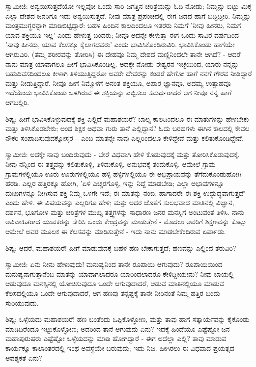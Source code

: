 ಸ್ವಾಮೀಜಿ: ಅನ್ವಯಿಸುತ್ತದೆಯೋ ಇಲ್ಲವೋ ಒಂದು ಸಾರಿ ಜಗತ್ತಿನ ಚರಿತ್ರೆಯನ್ನು ಓದಿ ನೋಡು; ನಿಮ್ಮನ್ನು ಬಿಟ್ಟು ಮಿಕ್ಕ ಎಲ್ಲಾ ದೇಶದ ಜನರಿಗೂ ಇದು ಅನ್ವಯಿಸುತ್ತದೆ. ನೀವು ಮಾತ್ರ ಪ್ರಪಂಚದಲ್ಲಿ ಈಗ ಜಡದ ಹಾಗೆ ಬಿದ್ದಿದ್ದೀರಿ. ನಿಮ್ಮನ್ನು ಮಂತ್ರಮುಗ್ಧರನ್ನಾಗಿ ಮಾಡಿಬಿಟ್ಟಿದ್ದಾರೆ: ಬಹಳ ಹಿಂದಿನ ಕಾಲದಿಂದಲೂ ಇತರರು ನಿಮಗೆ 'ನೀವು ಹೀನರು, ನಿಮಗೆ ಯಾವ ಶಕ್ತಿಯೂ ಇಲ್ಲ' ಎಂದು ಹೇಳುತ್ತ ಬಂದರು; ನೀವೂ ಅದನ್ನೇ ಕೇಳುತ್ತಾ ಈಗ ಒಂದು ಸಾವಿರ ವರ್ಷದಿಂದ 'ನಾವು ಹೀನರು, ಯಾವ ಕೆಲಸಕ್ಕೂ ಕೈಲಾಗದವರು' ಎಂದು ಭಾವಿಸಿಕೊಂಡಿರುವಿರಿ. ಭಾವಿಸಿಕೊಂಡು ಹಾಗೆಯೇ ಆಗಿರುವಿರಿ. (ತಮ್ಮ ಶರೀರವನ್ನು ತೋರಿಸಿ) ಈ ದೇಹವೂ ನಿಮ್ಮ ದೇಶದ ಮಣ್ಣಿನಿಂದಲೇ ತಾನೇ ಆಗಿದೆ? - ಆದರೆ ನಾನು ಮಾತ್ರ ಯಾವಾಗಲೂ ಹೀಗೆ ಭಾವಿಸಿಕೊಂಡಿಲ್ಲ. ಅದಕ್ಕೇ ನೋಡು ಈಶ್ವರನ ಇಚ್ಛೆಯಿಂದ, ಯಾರು ನನ್ನನ್ನು ಬಹುದಿವಸದಿಂದಲೂ ಕೀಳಾಗಿ ತಿಳಿಯುತ್ತಿದ್ದರೋ ಅವರೇ ದೇವರನ್ನು ಕಂಡರೆ ಹೇಗೋ ಹಾಗೆ ನನಗೆ ಗೌರವ ನೀಡಿದ್ದಾರೆ ಮತ್ತು ನೀಡುತ್ತಿದ್ದಾರೆ. ನೀವೂ ಹೀಗೆ ನಿಮ್ಮೊಳಗೆ ಅನಂತ ಶಕ್ತಿಯೂ, ಅಪಾರ ಜ್ಞಾನವೂ, ಅದಮ್ಯ ಉತ್ಸಾಹವೂ ಇದೆಯೆಂದು ಭಾವಿಸಿಕೊಂಡು ಒಳಗಿರುವ ಈ ಶಕ್ತಿಯನ್ನು ಎಬ್ಬಿಸಲು ಸಮರ್ಥರಾದರೆ ಆಗ ನೀವೂ ನನ್ನ ಹಾಗೆ ಆಗಬಲ್ಲಿರಿ.

ಶಿಷ್ಯ: ಹೀಗೆ ಭಾವಿಸಿಕೊಳ್ಳುವುದಕ್ಕೆ ಶಕ್ತಿ ಎಲ್ಲಿದೆ ಮಹಾಶಯರೆ? ಬಾಲ್ಯ ಕಾಲದಿಂದಲೂ ಈ ಮಾತುಗಳನ್ನು ಹೇಳಬೇಕು ಮತ್ತು ತಿಳಿಸಿಕೊಡಬೇಕು; ಅಂಥ ಶಿಕ್ಷಕ ಅಥವಾ ಗುರು ತಾನೆ ಎಲ್ಲಿದ್ದಾನೆ? ಓದು ಬರಹಗಳು ಈಗಿನ ಕಾಲದಲ್ಲಿ ಕೇವಲ ನೌಕರಿ ಸಂಪಾದಿಸುವುದಕ್ಕೋಸ್ಕರ – ಎಂಬ ಮಾತನ್ನೇ ನಾವು ಎಲ್ಲರಿಂದಲೂ ಕೇಳಿದ್ದೇವೆ ಮತ್ತು ಕಲಿತುಕೊಂಡಿದ್ದೇವೆ.

ಸ್ವಾಮೀಜಿ: ಅದಕ್ಕೇ ನಾವು ಬಂದಿರುವುದು - ಬೇರೆ ವಿಧವಾಗಿ ಹೇಳಿ ಕೊಡುವುದಕ್ಕೆ ಮತ್ತು ತೋರಿಸಿಕೊಡುವುದಕ್ಕೆ. ನೀವು ನನ್ನಿಂದ ಈ ತತ್ತ್ವವನ್ನು ಕಲಿತುಕೊಳ್ಳಿ, ತಿಳಿದುಕೊಳ್ಳಿ, ಅನುಭವಕ್ಕೆ ತಂದುಕೊಳ್ಳಿ. ಆಮೇಲೆ ಗ್ರಾಮ ಗ್ರಾಮಗಳಲ್ಲಿಯೂ ಊರು ಊರುಗಳಲ್ಲಿಯೂ ಹಳ್ಳಿ ಹಳ್ಳಿಗಳಲ್ಲಿಯೂ ಈ ಅಭಿಪ್ರಾಯವನ್ನು ತೆಗೆದುಕೊಂಡುಹೋಗಿ ಹರಡಿ. ಎಲ್ಲರ ಹತ್ತಿರಕ್ಕೂ ಹೋಗಿ, 'ಏಳಿ ಎಚ್ಚರಗೊಳ್ಳಿ, ಇನ್ನು ನಿದ್ದೆ ಮಾಡಬೇಡಿ; ಎಲ್ಲಾ ಅಭಾವಗಳನ್ನೂ ದುಃಖಗಳನ್ನೂ ನೀಗಿಸುವ ಶಕ್ತಿ ನಿಮ್ಮ ಒಳಗೇ ಇದೆ; ಈ ಮಾತನ್ನು ನಂಬಿ, ಹಾಗಾದರೇ ಈ ಶಕ್ತಿ ಉದ್ಭುದ್ಧವಾಗುತ್ತದೆ' ಎಂದು ಹೇಳಿ. ಈ ವಿಷಯವನ್ನು ಎಲ್ಲರಿಗೂ ಹೇಳಿ; ಮತ್ತು ಅದರ ಜೊತೆಗೆ ಸುಲಭವಾದ ಮಾತಿನಲ್ಲಿ ವಿಜ್ಞಾನ, ದರ್ಶನ, ಭೂಗೋಳ ಮತ್ತು ಚರಿತ್ರೆಗಳ ಮುಖ್ಯ ತತ್ತ್ವಗಳನ್ನು ಸಾಧಾರಣ ಜನರ ಮನಸ್ಸಿಗೆ ಅಂಟುವಂತೆ ತಿಳಿಸಿ. ನಾನು ಅವಿವಾಹಿತರಾದ ಯುವಕರನ್ನು ಸೇರಿಸಿ ಒಂದು ಕೇಂದ್ರವನ್ನು ಮಾಡುತ್ತೇನೆ - ಮೊದಲು ಅವರಿಗೆ ಶಿಕ್ಷಣವನ್ನು ಕೊಟ್ಟು ಆಮೇಲೆ ಅವರ ಮೂಲಕ ಈ ಕೆಲಸವನ್ನು ಮಾಡಿಸುತ್ತೇನೆ - ಇದು ನಾನು ಮಾಡಬೇಕೆಂದಿರುವ ಏರ್ಪಾಡು.

ಶಿಷ್ಯ: ಆದರೆ, ಮಹಾಶಯರೆ! ಹೀಗೆ ಮಾಡುವುದಕ್ಕೆ ಬಹಳ ಹಣ ಬೇಕಾಗುತ್ತದೆ; ಹಣವನ್ನು ಎಲ್ಲಿಂದ ತರುವಿರಿ?

ಸ್ವಾಮೀಜಿ: ಏನು ನೀನು ಹೇಳುವುದು! ಮನುಷ್ಯನಿಂದ ತಾನೇ ರೂಪಾಯಿ ಆಗುವುದು? ರೂಪಾಯಿಯಿಂದ ಮನುಷ್ಯನಾಗುತ್ತಾನೆಂಬ ಮಾತನ್ನು ಯಾವಾಗಲಾದರೂ ಯಾರಿಂದಲಾದರೂ ಕೇಳಿದ್ದೀಯೇನು? ನೀವು ಬಾಯಲ್ಲಿ ಆಡುವುದೂ ಮನಸ್ಸಿನಲ್ಲಿ ಯೋಚಿಸುವುದೂ ಒಂದೇ ಆಗುವುದಾದರೆ, ಆಡುವ ಮಾತಿನಲ್ಲಿಯೂ ಮಾಡುವ ಕೆಲಸದಲ್ಲಿಯೂ ಒಂದೇ ಆಗುವುದಾದರೆ, ಆಗ ಹಣವು ತನ್ನಷ್ಟಕ್ಕೆ ತಾನೇ ನೀರಿನಂತೆ ನಿಮ್ಮ ಹತ್ತಿರ ಬಂದು ಸುರಿಯುವುದು.

ಶಿಷ್ಯ: ಒಳ್ಳೆಯದು ಮಹಾಶಯರೆ! ಹಣ ಬಂತೆಂದು ಒಪ್ಪಿಕೊಳ್ಳೋಣ, ಮತ್ತು ತಾವು ಹಾಗೆ ಸತ್ಕಾರ್ಯವನ್ನು ಕೈಕೊಂಡು ಮಾಡಿದಿರೆಂದೂ ಇಟ್ಟುಕೊಳ್ಳೋಣ; ಅದರಿಂದ ತಾನೆ ಆಗುವುದು ಏನು? ಇದಕ್ಕೆ ಹಿಂದೆಯೂ ಎಷ್ಟೆಷ್ಟೋ ಜನ ಮಹಾಪುರುಷರು ಎಷ್ಟೆಷ್ಟೋ ಒಳ್ಳೆಯದನ್ನು ಮಾಡಿ ಹೋಗಿದ್ದಾರೆ - ಈಗ ಅದೆಲ್ಲಾ ಎಲ್ಲಿ? ತಾವು ಮಾಡುವ ಕಾರ್ಯಕ್ಕೂ ಕಾಲಾಂತರದಲ್ಲಿ ಇಂಥ ಅವಸ್ಥೆಯೇ ಬರುವುದು; ಇದು ನಿಜ. ಹೀಗಿರಲು ಈ ವಿಧವಾದ ಪ್ರಯತ್ನದ ಆವಶ್ಯಕತೆ ಏನು?

